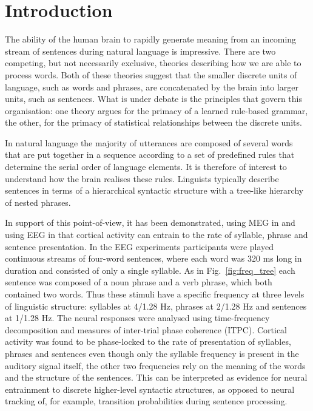 \documentclass[a4paper,10pt,twoside]{article}
\begin{document}
\section{Introduction}

The ability of the human brain to rapidly generate meaning from an
incoming stream of sentences during natural language is
impressive. There are two competing, but not necessarily exclusive, theories describing how we are able to process words. Both of these theories suggest that the smaller discrete units of language,
such as words and phrases, are concatenated by the brain into larger
units, such as sentences. What is under debate is the principles that
govern this organisation: one theory argues for the primacy of a
learned rule-based grammar, the other, for the primacy of statistical
relationships between the discrete units.

In natural language the majority of utterances are composed of several
words that are put together in a sequence according to a set of
predefined rules that determine the serial order of language
elements. It is therefore of interest to understand how the brain
realises these rules. Linguists typically describe sentences in terms
of a hierarchical syntactic structure with a tree-like hierarchy of
nested phrases.

In support of this point-of-view, it has been demonstrated, using MEG
in \cite{DingEtAl2016} and using EEG in \cite{DingEtAl2017} that
cortical activity can entrain to the rate of syllable, phrase and
sentence presentation. In the EEG experiments participants were played
continuous streams of four-word sentences, where each word was 320 ms
long in duration and consisted of only a single syllable. As in
Fig.~\ref{fig:freq_tree} each sentence was composed of a noun phrase
and a verb phrase, which both contained two words. Thus these stimuli
have a specific frequency at three levels of linguistic structure:
syllables at 4/1.28 Hz, phrases at 2/1.28 Hz and sentences at 1/1.28
Hz. The neural responses were analysed using time-frequency
decomposition and measures of inter-trial phase coherence
(ITPC). Cortical activity was found to be phase-locked to the rate of
presentation of syllables, phrases and sentences even though only the
syllable frequency is present in the auditory signal itself, the other two
frequencies rely on the meaning of the words and the structure of the
sentences.  This can be interpreted as evidence for neural
entrainment to discrete higher-level syntactic structures, as opposed
to neural tracking of, for example, transition probabilities during
sentence processing.
\end{document}

